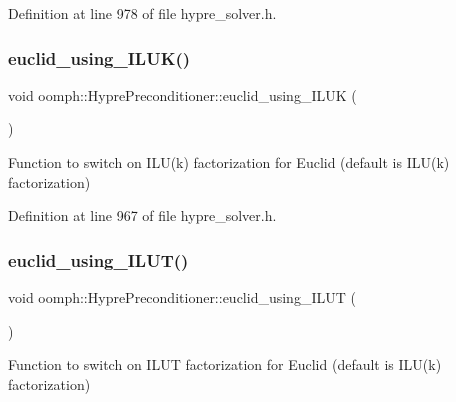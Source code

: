 Definition at line 978 of file hypre\+\_\+solver.\+h.

\mbox{\label{classoomph_1_1HyprePreconditioner_a635c84d0bdf407eb532e09f9ebe38d9f}} 
\subsubsection{\texorpdfstring{euclid\+\_\+using\+\_\+\+I\+L\+U\+K()}{euclid\_using\_ILUK()}}
{\footnotesize\ttfamily void oomph\+::\+Hypre\+Preconditioner\+::euclid\+\_\+using\+\_\+\+I\+L\+UK (\begin{DoxyParamCaption}{ }\end{DoxyParamCaption})\hspace{0.3cm}{\ttfamily [inline]}}



Function to switch on I\+L\+U(k) factorization for Euclid (default is I\+L\+U(k) factorization) 



Definition at line 967 of file hypre\+\_\+solver.\+h.

\mbox{\label{classoomph_1_1HyprePreconditioner_a55b6027d5212c7e66eec212341dd0af6}} 
\subsubsection{\texorpdfstring{euclid\+\_\+using\+\_\+\+I\+L\+U\+T()}{euclid\_using\_ILUT()}}
{\footnotesize\ttfamily void oomph\+::\+Hypre\+Preconditioner\+::euclid\+\_\+using\+\_\+\+I\+L\+UT (\begin{DoxyParamCaption}{ }\end{DoxyParamCaption})\hspace{0.3cm}{\ttfamily [inline]}}



Function to switch on I\+L\+UT factorization for Euclid (default is I\+L\+U(k) factorization) 



